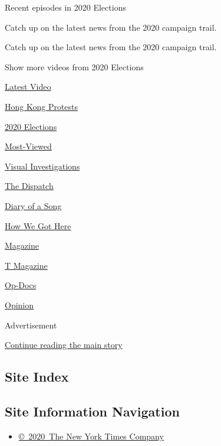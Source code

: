 Recent episodes in 2020 Elections

Catch up on the latest news from the 2020 campaign trail.

Catch up on the latest news from the 2020 campaign trail.

Show more videos from 2020 Elections

\href{/video}{}

\href{/video/latest-video}{Latest Video}

\href{/video/hk-protest}{Hong Kong Protests}

\href{/video/2020-Elections}{2020 Elections}

\href{/video/Most-Viewed}{Most-Viewed}

\href{/video/investigations}{Visual Investigations}

\href{/video/on-the-ground}{The Dispatch}

\href{/video/diaryofasong}{Diary of a Song}

\href{/video/how-we-got-here}{How We Got Here}

\href{/video/magazine}{Magazine}

\href{/video/t-magazine}{T Magazine}

\href{/video/op-docs}{Op-Docs}

\href{/video/opinion}{Opinion}

Advertisement

\protect\hyperlink{after-bottom}{Continue reading the main story}

\hypertarget{site-index}{%
\subsection{Site Index}\label{site-index}}

\hypertarget{site-information-navigation}{%
\subsection{Site Information
Navigation}\label{site-information-navigation}}

\begin{itemize}
\tightlist
\item
  \href{https://help.nytimes3xbfgragh.onion/hc/en-us/articles/115014792127-Copyright-notice}{©~2020~The
  New York Times Company}
\end{itemize}

